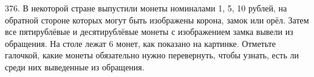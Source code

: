 376. В некоторой стране выпустили монеты номиналами 1, 5, 10 рублей, на обратной стороне которых
могут быть изображены корона, замок или орёл. Затем все пятирублёвые и десятирублёвые монеты
с изображением замка вывели из обращения. На столе лежат 6 монет, как показано на картинке.
Отметьте галочкой, какие монеты обязательно нужно перевернуть, чтобы узнать, есть ли среди них
выведенные из обращения.\\
\begin{figure}[ht!]
\end{figure}\\
